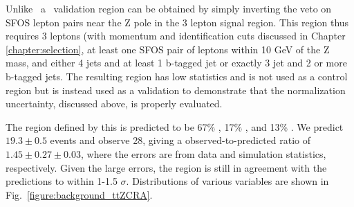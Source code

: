 Unlike \ttW\, a \ttZ\ validation region can be obtained by simply inverting the veto on SFOS lepton pairs near the Z pole in the 3 lepton signal region. This region thus requires 3 leptons (with momentum and identification cuts discussed in Chapter \ref{chapter:selection}, at least one SFOS pair of leptons within 10 GeV of the Z mass, and either 4 jets and at least 1 b-tagged jet or exactly 3 jet and 2 or more b-tagged jets. The resulting region has low statistics and is not used as a control region but is instead used as a validation to demonstrate that the normalization uncertainty, discussed above, is properly evaluated. 

The region defined by this is predicted to be 67\% \ttZ, 17\% \WZ, and 13\% \tZ.  We predict $19.3 \pm 0.5$ events and observe 28, giving a observed-to-predicted ratio of $1.45 \pm 0.27 \pm 0.03$, where the errors are from data and simulation statistics, respectively. Given the large errors, the region is still in agreement with the predictions to within 1-1.5 $\sigma$.  Distributions of various variables are shown in Fig.~\ref{figure:background_ttZCRA}.  

